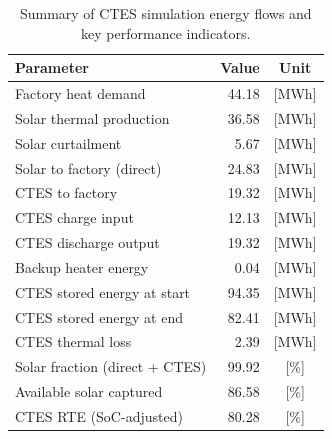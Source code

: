 \renewcommand{\arraystretch}{1.2}
\begin{table}[h]
\centering
\begin{tabular}{l|r c}
\hline
Parameter & Value & Unit \\
\hline
Factory heat demand & 44.18 & [MWh] \\
Solar thermal production & 36.58 & [MWh] \\
Solar curtailment & 5.67 & [MWh] \\
Solar to factory (direct) & 24.83 & [MWh] \\
CTES to factory & 19.32 & [MWh] \\
CTES charge input & 12.13 & [MWh] \\
CTES discharge output & 19.32 & [MWh] \\
Backup heater energy & 0.04 & [MWh] \\
CTES stored energy at start & 94.35 & [MWh] \\
CTES stored energy at end & 82.41 & [MWh] \\
CTES thermal loss & 2.39 & [MWh] \\
\hline
Solar fraction (direct + CTES) & 99.92 & [\%] \\
Available solar captured & 86.58 & [\%] \\
CTES RTE (SoC-adjusted) & 80.28 & [\%] \\
\hline
\end{tabular}
\caption{Summary of CTES simulation energy flows and key performance indicators.}
\label{tab:ctes-simulation-summary}
\end{table}
